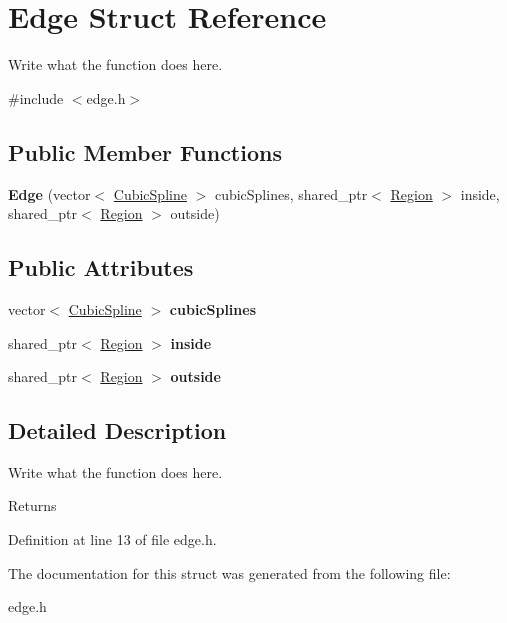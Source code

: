 \hypertarget{structEdge}{\section{Edge Struct Reference}
\label{structEdge}
}


Write what the function does here.  




{\ttfamily \#include $<$edge.\+h$>$}

\subsection*{Public Member Functions}
\begin{DoxyCompactItemize}
\item 
\hypertarget{structEdge_ae88b2eacc8420832ac0b4642e42177f1}{{\bfseries Edge} (vector$<$ \hyperlink{structCubicSpline}{Cubic\+Spline} $>$ cubic\+Splines, shared\+\_\+ptr$<$ \hyperlink{structRegion}{Region} $>$ inside, shared\+\_\+ptr$<$ \hyperlink{structRegion}{Region} $>$ outside)}\label{structEdge_ae88b2eacc8420832ac0b4642e42177f1}

\end{DoxyCompactItemize}
\subsection*{Public Attributes}
\begin{DoxyCompactItemize}
\item 
\hypertarget{structEdge_a3e6e9829abcffa41c78a09de513e2734}{vector$<$ \hyperlink{structCubicSpline}{Cubic\+Spline} $>$ {\bfseries cubic\+Splines}}\label{structEdge_a3e6e9829abcffa41c78a09de513e2734}

\item 
\hypertarget{structEdge_a8fe1ad8fd85914e617fb6084440fd863}{shared\+\_\+ptr$<$ \hyperlink{structRegion}{Region} $>$ {\bfseries inside}}\label{structEdge_a8fe1ad8fd85914e617fb6084440fd863}

\item 
\hypertarget{structEdge_a827600852145737ed547bb3fd75c7c47}{shared\+\_\+ptr$<$ \hyperlink{structRegion}{Region} $>$ {\bfseries outside}}\label{structEdge_a827600852145737ed547bb3fd75c7c47}

\end{DoxyCompactItemize}


\subsection{Detailed Description}
Write what the function does here. 

\begin{DoxyReturn}{Returns}

\end{DoxyReturn}


Definition at line 13 of file edge.\+h.



The documentation for this struct was generated from the following file\+:\begin{DoxyCompactItemize}
\item 
edge.\+h\end{DoxyCompactItemize}
